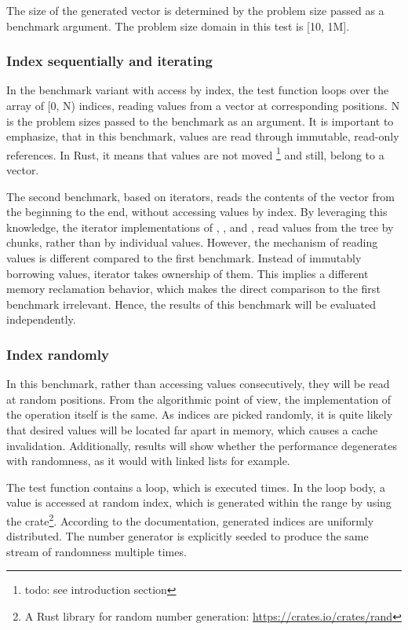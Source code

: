 The size of the generated vector is determined by the problem size passed as a benchmark argument. The problem size domain in this test is [10, 1M]. 

\subsubsection*{Index sequentially and iterating}
In the benchmark variant with access by index, the test function loops over the array of [0, N) indices, reading values from a vector at corresponding positions. N is the problem sizes passed to the benchmark as an argument. It is important to emphasize, that in this benchmark, values are read through immutable, read-only references. In Rust, it means that values are not moved \footnote{todo: see introduction section} and still, belong to a vector. 

The second benchmark, based on iterators, reads the contents of the vector from the beginning to the end, without accessing values by index. By leveraging this knowledge, the iterator implementations of \rbvec{}, \rrbvec{}, and \pvec{}, read values from the tree by chunks, rather than by individual values. However, the mechanism of reading values is different compared to the first benchmark. Instead of immutably borrowing values, iterator takes ownership of them. This implies a different memory reclamation behavior, which makes the direct comparison to the first benchmark irrelevant. Hence, the results of this benchmark will be evaluated independently. 

\subsubsection*{Index randomly}
In this benchmark, rather than accessing values consecutively, they will be read at random positions. From the algorithmic point of view, the implementation of the operation itself is the same. As indices are picked randomly, it is quite likely that desired values will be located far apart in memory, which causes a cache invalidation. Additionally, results will show whether the performance degenerates with randomness, as it would with linked lists for example. 

The test function contains a loop, which is executed \n{} times. In the loop body, a value is accessed at random index, which is generated within the \range{[0, N)} range by using the  crate\footnote{A Rust library for random number generation: \url{https://crates.io/crates/rand}}. According to the  documentation, generated indices are uniformly distributed. The number generator is explicitly seeded to produce the same stream of randomness multiple times.

